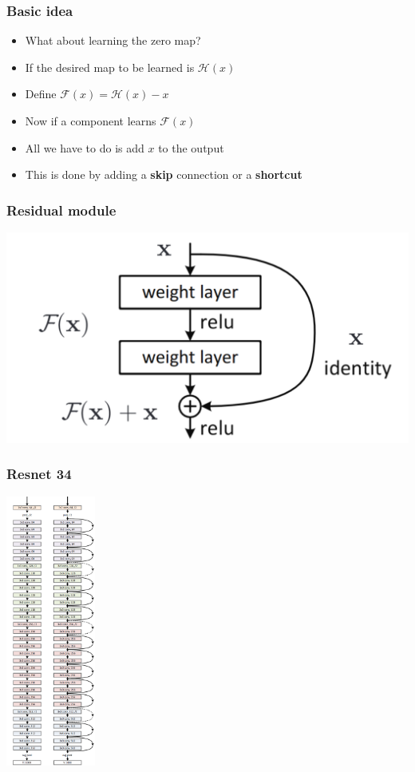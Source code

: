 \documentclass{beamer}
\begin{document}
\begin{frame}
    \frametitle{Basic idea}
\begin{itemize}
    \item What about learning the zero map?
    \item If the desired map to be learned is $\mathcal{H}(x)$
    \item Define $\mathcal{F}(x)=\mathcal{H}(x)-x$
    \item Now if a component learns $\mathcal{F}(x)$
    \item All we have to do is add $x$ to the output
    \item This is done by adding a \textbf{skip} connection or a \textbf{shortcut}
\end{itemize}

\end{frame}
\begin{frame}
    \frametitle{Residual module}

    \begin{center}
        \includegraphics[width=\textwidth]{figs/residual-block.png}
    \end{center}
\end{frame}
\begin{frame}
    \frametitle{Resnet 34}

    \begin{center}
        \includegraphics[width=0.22\textwidth]{figs/resnet34.png}
    \end{center}

\end{frame}
\end{document}
